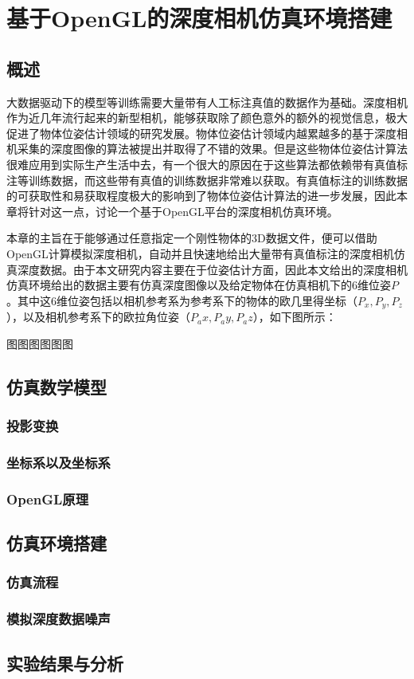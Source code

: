 \chapter{基于OpenGL的深度相机仿真环境搭建}

\section{概述}
大数据驱动下的模型等训练需要大量带有人工标注真值的数据作为基础。深度相机作为近几年流行起来的新型相机，能够获取除了颜色意外的额外的视觉信息，极大促进了物体位姿估计领域的研究发展。物体位姿估计领域内越累越多的基于深度相机采集的深度图像的算法被提出并取得了不错的效果。但是这些物体位姿估计算法很难应用到实际生产生活中去，有一个很大的原因在于这些算法都依赖带有真值标注等训练数据，而这些带有真值的训练数据非常难以获取。有真值标注的训练数据的可获取性和易获取程度极大的影响到了物体位姿估计算法的进一步发展，因此本章将针对这一点，讨论一个基于OpenGL平台的深度相机仿真环境。

本章的主旨在于能够通过任意指定一个刚性物体的3D数据文件，便可以借助OpenGL计算模拟深度相机，自动并且快速地给出大量带有真值标注的深度相机仿真深度数据。由于本文研究内容主要在于位姿估计方面，因此本文给出的深度相机仿真环境给出的数据主要有仿真深度图像以及给定物体在仿真相机下的6维位姿$P$。其中这6维位姿包括以相机参考系为参考系下的物体的欧几里得坐标（$P_x,P_y,P_z$），以及相机参考系下的欧拉角位姿（$P_ax,P_ay,P_az$），如下图所示：

图图图图图图





\section{仿真数学模型}
\subsection{投影变换}
\subsection{坐标系以及坐标系} %
\subsection{OpenGL原理} %

\section{仿真环境搭建}
\subsection{仿真流程} %
\subsection{模拟深度数据噪声} %

\section{实验结果与分析}
